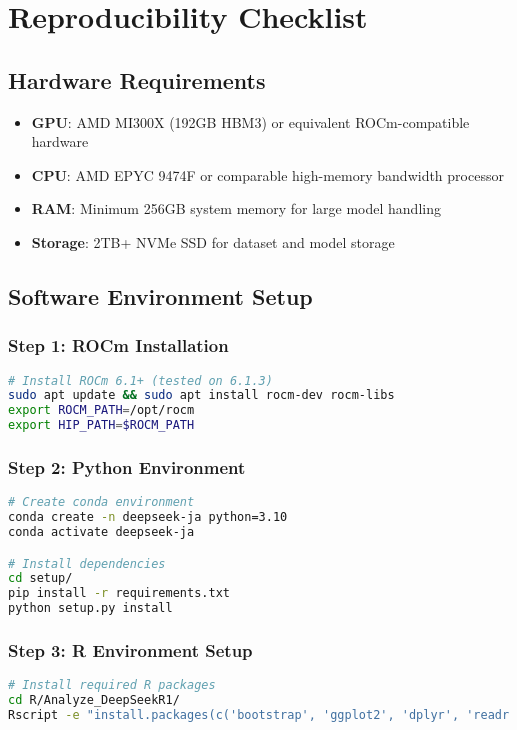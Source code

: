 \documentclass[12pt,a4paper]{article}
\begin{document}
\section{Reproducibility Checklist}

\subsection{Hardware Requirements}

\begin{itemize}
\item \textbf{GPU}: AMD MI300X (192GB HBM3) or equivalent ROCm-compatible hardware
\item \textbf{CPU}: AMD EPYC 9474F or comparable high-memory bandwidth processor
\item \textbf{RAM}: Minimum 256GB system memory for large model handling
\item \textbf{Storage}: 2TB+ NVMe SSD for dataset and model storage
\end{itemize}

\subsection{Software Environment Setup}

\subsubsection{Step 1: ROCm Installation}
\begin{lstlisting}[language=bash]
# Install ROCm 6.1+ (tested on 6.1.3)
sudo apt update && sudo apt install rocm-dev rocm-libs
export ROCM_PATH=/opt/rocm
export HIP_PATH=$ROCM_PATH
\end{lstlisting}

\subsubsection{Step 2: Python Environment}
\begin{lstlisting}[language=bash]
# Create conda environment
conda create -n deepseek-ja python=3.10
conda activate deepseek-ja

# Install dependencies
cd setup/
pip install -r requirements.txt
python setup.py install
\end{lstlisting}

\subsubsection{Step 3: R Environment Setup}
\begin{lstlisting}[language=bash]
# Install required R packages
cd R/Analyze_DeepSeekR1/
Rscript -e "install.packages(c('bootstrap', 'ggplot2', 'dplyr', 'readr'))"
\end{lstlisting}
\end{document}
